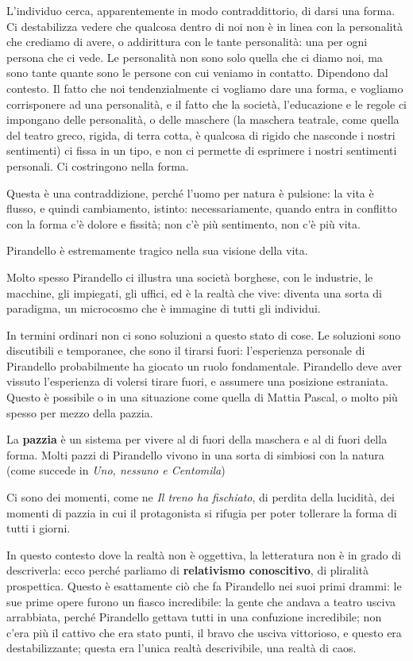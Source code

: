 \documentclass[a4paper, twoside, titlepage]{book}
\begin{document}
L'individuo cerca, apparentemente in modo contraddittorio, di darsi una forma. Ci destabilizza vedere che qualcosa dentro di noi non è in linea con la personalità che crediamo di avere, o addirittura con le tante personalità: una per ogni persona che ci vede.
Le personalità non sono solo quella che ci diamo noi, ma sono tante quante sono le persone con cui veniamo in contatto. Dipendono dal contesto.
Il fatto che noi tendenzialmente ci vogliamo dare una forma, e vogliamo corrisponere ad una personalità, e il fatto che la società, l'educazione e le regole ci impongano delle personalità, o delle maschere (la maschera teatrale, come quella del teatro greco, rigida, di terra cotta, è qualcosa di rigido che nasconde i nostri sentimenti) ci fissa in un tipo, e non ci permette di esprimere i nostri sentimenti personali. Ci costringono nella forma.

Questa è una contraddizione, perché l'uomo per natura è pulsione: la vita è flusso, e quindi cambiamento, istinto: necessariamente, quando entra in conflitto con la forma c'è dolore e fissità; non c'è più sentimento, non c'è più vita.

Pirandello è estremamente tragico nella sua visione della vita.

Molto spesso Pirandello ci illustra una società borghese, con le industrie, le macchine, gli impiegati, gli uffici, ed è la realtà che vive: diventa una sorta di paradigma, un microcosmo che è immagine di tutti gli individui.

In termini ordinari non ci sono soluzioni a questo stato di cose. Le soluzioni sono discutibili e temporanee, che sono il tirarsi fuori: l'esperienza personale di Pirandello probabilmente ha giocato un ruolo fondamentale.
Pirandello deve aver vissuto l'esperienza di volersi tirare fuori, e assumere una posizione estraniata.
Questo è possibile o in una situazione come quella di Mattia Pascal, o molto più spesso per mezzo della pazzia.

La \textbf{pazzia} è un sistema per vivere al di fuori della maschera e al di fuori della forma. Molti pazzi di Pirandello vivono in una sorta di simbiosi con la natura (come succede in \textit{Uno, nessuno e Centomila})

Ci sono dei momenti, come ne \textit{Il treno ha fischiato}, di perdita della lucidità, dei momenti di pazzia in cui il protagonista si rifugia per poter tollerare la forma di tutti i giorni.

In questo contesto dove la realtà non è oggettiva, la letteratura non è in grado di descriverla: ecco perché parliamo di \textbf{relativismo conoscitivo}, di pliralità prospettica.
Questo è esattamente ciò che fa Pirandello nei suoi primi drammi: le sue prime opere furono un fiasco incredibile: la gente che andava a teatro usciva arrabbiata, perché Pirandello gettava tutti in una confuzione incredibile; non c'era più il cattivo che era stato punti, il bravo che usciva vittorioso, e questo era destabilizzante; questa era l'unica realtà descrivibile, una realtà di caos.
\end{document}
